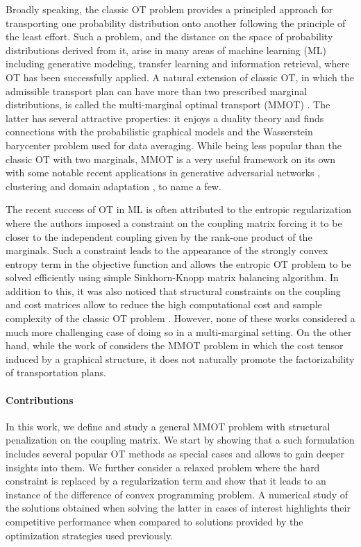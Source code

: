 Broadly speaking, the classic OT problem provides a principled approach for transporting one probability distribution onto another
following the principle of the least effort. Such a problem, and the distance on the space of probability distributions derived from it,
arise in many areas of machine learning (ML) including generative modeling, transfer learning and information retrieval, where OT has
been successfully applied. A natural extension of classic OT, in which the admissible transport plan can have more
than two prescribed marginal distributions, is called the multi-marginal optimal transport (MMOT) \citep{Gangbo98}.
The latter has several attractive properties: it enjoys a duality theory \citep{Kellerer84} and finds connections with the
probabilistic graphical models \citep{Haasler20} and the Wasserstein barycenter problem \citep{Agueh11} used for data averaging.
While being less popular than the classic OT with two marginals, MMOT is a very useful framework on its own with some notable recent
applications in generative adversarial networks \citep{Cao19}, clustering \citep{Mi21} and domain adaptation
\citep{HuiLCHY18,HeZKSC19}, to name a few.

The recent success of OT in ML is often attributed to the entropic regularization \citep{Cuturi13} where the authors imposed a
constraint on the coupling matrix forcing it to be closer to the independent coupling given by the rank-one product of the marginals.
Such a constraint leads to the appearance of the strongly convex entropy term in the objective function and allows the entropic
OT problem to be solved efficiently using simple Sinkhorn-Knopp matrix balancing algorithm. In addition to this, it was also noticed
that structural constraints on the coupling and cost matrices allow to reduce the high computational cost and sample complexity
of the classic OT problem \citep{Genevay19,Forrow18,Chiheng21,Meyer21a}. However, none of these works considered a much more
challenging case of doing so in a multi-marginal setting. On the other hand, while the work of \citet{Haasler20} considers the MMOT
problem in which the cost tensor induced by a graphical structure, it does not naturally promote the factorizability of
transportation plans.

\paragraph{Contributions} In this work, we define and study a general MMOT problem with structural penalization on the coupling matrix.
We start by showing that a such formulation includes several popular OT methods as special cases and allows to gain deeper insights
into them. We further consider a relaxed problem where the hard constraint is replaced by a regularization term and show that it leads
to an instance of the difference of convex programming problem. A numerical study of the solutions obtained when solving the latter
in cases of interest highlights their competitive performance when compared to solutions provided by the optimization
strategies used previously.

